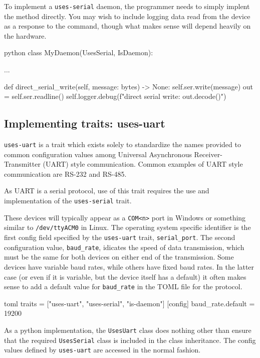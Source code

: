 To implement a \texttt{uses-serial} daemon, the programmer needs to simply implent the method directly.
You may wish to include logging data read from the device as a response to the command, though what makes sense will depend heavily on the hardware.

\begin{codefragment}{python}
class MyDaemon(UsesSerial, IsDaemon):

    ...

    def direct_serial_write(self, message: bytes) -> None:
        self.ser.write(message)
        out = self.ser.readline()
        self.logger.debug(f"direct serial write: {out.decode()}")
\end{codefragment}


\subsection{Implementing traits: uses-uart}

\texttt{uses-uart} is a trait which exists solely to standardize the names provided to common configuration values among Universal Asynchronous Receiver-Transmitter (UART) style communication.
Common examples of UART style communication are RS-232\cite{} and RS-485\cite{}.

As UART is a serial protocol, use of this trait requires the use and implementation of the \texttt{uses-serial} trait.

These devices will typically appear as a \texttt{COM<n>} port in Windows or something similar to \texttt{/dev/ttyACM0} in Linux.
The operating system specific identifier is the first config field specified by the \texttt{uses-uart} trait, \texttt{serial\_port}.
The second configuration value, \texttt{baud\_rate}, idicates the speed of data transmission, which must be the same for both devices on either end of the transmission.
Some devices have variable baud rates, while others have fixed baud rates.
In the latter case (or even if it is variable, but the device itself has a default) it often makes sense to add a default value for \texttt{baud\_rate} in the TOML file for the protocol.

\begin{codefragment}{toml}\noop
traits = ["uses-uart", "uses-serial", "is-daemon"]
[config]
baud_rate.default = 19200
\end{codefragment}

As a python implementation, the \texttt{UsesUart} class does nothing other than ensure that the required \texttt{UsesSerial} class is included in the class inheritance.
The config values defined by \texttt{uses-uart} are accessed in the normal fashion.

